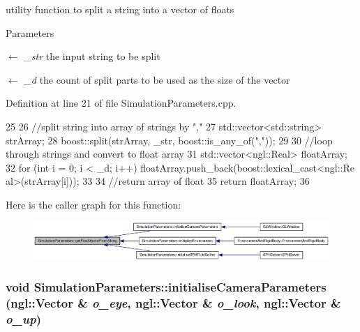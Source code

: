 utility function to split a string into a vector of floats 


\begin{DoxyParams}{Parameters}
\item[\mbox{$\leftarrow$} {\em \_\-str}]the input string to be split \item[\mbox{$\leftarrow$} {\em \_\-d}]the count of split parts to be used as the size of the vector \end{DoxyParams}


Definition at line 21 of file SimulationParameters.cpp.




\begin{DoxyCode}
25 {
26     //split string into array of strings by ","
27     std::vector<std::string> strArray;
28     boost::split(strArray, _str, boost::is_any_of(","));
29 
30     //loop through strings and convert to float array
31     std::vector<ngl::Real> floatArray;
32     for (int i = 0; i < _d; i++) floatArray.push_back(boost::lexical_cast<ngl::Re
      al>(strArray[i]));
33 
34     //return array of float
35     return floatArray;
36 }
\end{DoxyCode}




Here is the caller graph for this function:\nopagebreak
\begin{figure}[H]
\begin{center}
\leavevmode
\includegraphics[width=418pt]{class_simulation_parameters_ab6ed6ff4568848297f4a50603093d3d5_icgraph}
\end{center}
\end{figure}


\hypertarget{class_simulation_parameters_a95fed9bc4d0fec10543b5550f06e80ff}{
\subsubsection[{initialiseCameraParameters}]{\setlength{\rightskip}{0pt plus 5cm}void SimulationParameters::initialiseCameraParameters (ngl::Vector \& {\em o\_\-eye}, \/  ngl::Vector \& {\em o\_\-look}, \/  ngl::Vector \& {\em o\_\-up})}}
\label{class_simulation_parameters_a95fed9bc4d0fec10543b5550f06e80ff}


